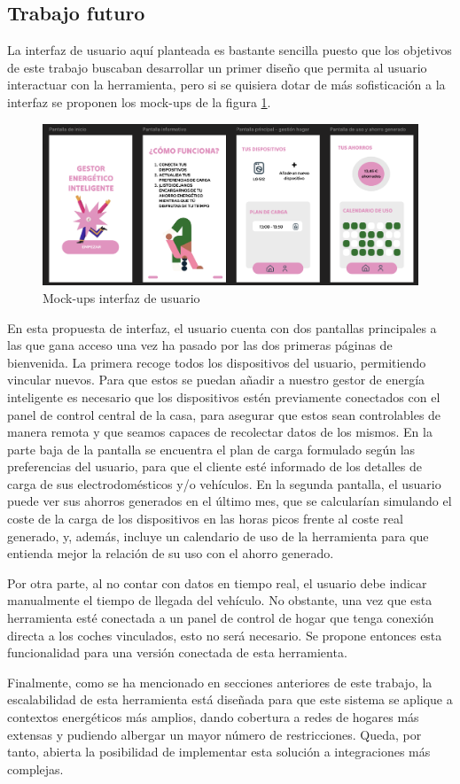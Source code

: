 \documentclass[11pt,a4paper]{book}
\begin{document}
\subsection{Trabajo futuro}
La interfaz de usuario aquí planteada es bastante sencilla puesto que los objetivos de este trabajo buscaban desarrollar un primer diseño que permita al usuario interactuar con la herramienta, pero si se quisiera dotar de más sofisticación a la interfaz se proponen los mock-ups de la figura \ref{fig:mock-up}.
\begin{figure}
    \centering
    \includegraphics[width=0.95\linewidth]{fig/mockups.png}
    \caption{Mock-ups interfaz de usuario}
    \label{fig:mock-up}
\end{figure}
En esta propuesta de interfaz, el usuario cuenta con dos pantallas principales a las que gana acceso una vez ha pasado por las dos primeras páginas de bienvenida. La primera recoge todos los dispositivos del usuario, permitiendo vincular nuevos. Para que estos se puedan añadir a nuestro gestor de energía inteligente es necesario que los dispositivos estén previamente conectados con el panel de control central de la casa, para asegurar que estos sean controlables de manera remota y que seamos capaces de recolectar datos de los mismos. En la parte baja de la pantalla se encuentra el plan de carga formulado según las preferencias del usuario, para que el cliente esté informado de los detalles de carga de sus electrodomésticos y/o vehículos. En la segunda pantalla, el usuario puede ver sus ahorros generados en el último mes, que se calcularían simulando el coste de la carga de los dispositivos en las horas picos frente al coste real generado, y, además, incluye un calendario de uso de la herramienta para que entienda mejor la relación de su uso con el ahorro generado.

Por otra parte, al no contar con datos en tiempo real, el usuario debe indicar manualmente el tiempo de llegada del vehículo. No obstante, una vez que esta herramienta esté conectada a un panel de control de hogar que tenga conexión directa a los coches vinculados, esto no será necesario. Se propone entonces esta funcionalidad para una versión conectada de esta herramienta.

Finalmente, como se ha mencionado en secciones anteriores de este trabajo, la escalabilidad de esta herramienta está diseñada para que este sistema se aplique a contextos energéticos más amplios, dando cobertura a redes de hogares más extensas y pudiendo albergar un mayor número de restricciones. Queda, por tanto, abierta la posibilidad de implementar esta solución a integraciones más complejas. 



\end{document}
